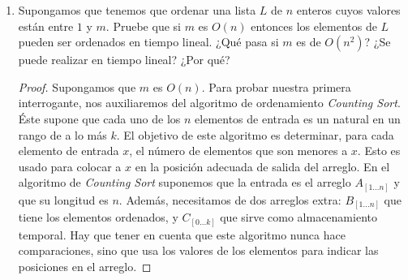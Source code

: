 \documentclass[letterpaper,11pt]{article}
\begin{document}
\begin{enumerate}
\begin{enumerate}
        \item Show that the number of swaps executed by \textsc{stupidsort} is
        at most $\big(\begin{smallmatrix} n \\ 2 \end{smallmatrix}\big)$.

        \begin{proof}
            Sabemos que si $n = 2$, en caso de que estén desordenados, entonces 
            el algoritmo realizará a lo más $1$ swap. En particular, notemos que 
            \textsc{stupidsort} sólo realizará swaps en pares de elementos 
            cuyos índices sean consecutivos y que estén desordenados, es decir, 
            en pares de elementos de la forma $A[i], A[i+1]$ con $A[i] > A[i+1]$.
            El peor caso que podemos tener es cuando nuestro arreglo $A$ está 
            ordenado al revés, entonces el número de intercambios requerido para 
            ordenarlo es exactamente $\big(\begin{smallmatrix} n \\ 2 
            \end{smallmatrix}\big)$ ya que cada dos elementos $i, j$ con $i > j$
            serán eventualmente adyacentes en el arreglo y serán intercambiados.

        \end{proof}
    \end{enumerate}

    \item Supongamos que tenemos que ordenar una lista $L$ de $n$ enteros cuyos
    valores están entre $1$ y $m$. Pruebe que si $m$ es $O(n)$ entonces los 
    elementos de $L$ pueden ser ordenados en tiempo lineal. ¿Qué pasa si $m$ es 
    de $O(n^2)$? ¿Se puede realizar en tiempo lineal? ¿Por qué?

    \begin{proof}
        Supongamos que $m$ es $O(n)$. Para probar nuestra primera interrogante,
        nos auxiliaremos del algoritmo de ordenamiento \textit{Counting Sort}.
        Éste supone que cada uno de los $n$ elementos de entrada es un natural
        en un rango de a lo más $k$. El objetivo de este algoritmo es 
        determinar, para cada elemento de entrada $x$, el número de elementos 
        que son menores a $x$. Esto es usado para colocar a $x$ en la posición 
        adecuada de salida del arreglo. En el algoritmo de \textit{Counting 
        Sort} suponemos que la entrada es el arreglo $A_{[1...n]}$ y que su 
        longitud es $n$. Además, necesitamos de dos arreglos extra: 
        $B_{[1...n]}$ que tiene los elementos ordenados, y $C_{[0...k]}$ que 
        sirve como almacenamiento temporal. Hay que tener en cuenta que este 
        algoritmo nunca hace comparaciones, sino que usa los valores de los 
        elementos para indicar las posiciones en el arreglo.


\end{proof}
\end{enumerate}
\end{document}
